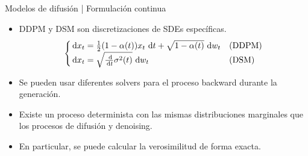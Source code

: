 \documentclass[aspectratio=43, 10pt]{beamer} %
\begin{document}
\begin{frame}{Modelos de difusión | Formulación continua}
    \begin{itemize}
        \item<1> DDPM y DSM son discretizaciones de SDEs específicas.
        {
            \begin{equation*}
                \begin{cases}
                    \,\operatorname{d}\! x_t = \frac{1}{2}(1-\alpha(t))x_t \,\operatorname{d}\! t + \sqrt{1-\alpha(t)}\,\operatorname{d}\! w_t & \text{(DDPM)}\\
                    \,\operatorname{d}\! x_t = \sqrt{\frac{\,\operatorname{d}\!}{\,\operatorname{d}\! t}\sigma^2(t)}\,\operatorname{d}\! w_t & \text{(DSM)}
                \end{cases}
            \end{equation*}
        }
        \item<2> Se pueden usar diferentes solvers para el proceso backward durante la generación.
        \item<3> Existe un proceso determinista con las mismas distribuciones marginales que los procesos de difusión y denoising.
        \item<4> En particular, se puede calcular la verosimilitud de forma exacta.
    \end{itemize}
\end{frame}
\end{document}
